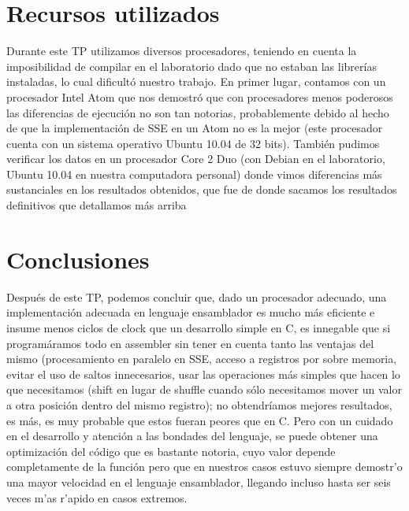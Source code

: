 \documentclass[a4paper,10pt]{article}
\begin{document}
\section{Recursos utilizados}

Durante este TP utilizamos diversos procesadores, teniendo en cuenta la imposibilidad de compilar en el laboratorio dado que no estaban las librerías instaladas, lo cual dificultó nuestro trabajo. En primer lugar, contamos con un procesador Intel Atom que nos demostró que con procesadores menos poderosos las diferencias de ejecución no son tan notorias, probablemente debido al hecho de que la implementación de SSE en un Atom no es la mejor (este procesador cuenta con un sistema operativo Ubuntu 10.04 de 32 bits). También pudimos verificar los datos en un procesador Core 2 Duo (con Debian en el laboratorio, Ubuntu 10.04 en nuestra computadora personal) donde vimos diferencias más sustanciales en los resultados obtenidos, que fue de donde sacamos los resultados definitivos que detallamos más arriba

\section{Conclusiones}

Después de este TP, podemos concluir que, dado un procesador adecuado, una implementación adecuada en lenguaje ensamblador es mucho más eficiente e insume menos ciclos de clock que un desarrollo simple en C, es innegable que si programáramos todo en assembler sin tener en cuenta tanto las ventajas del mismo (procesamiento en paralelo en SSE, acceso a registros por sobre memoria, evitar el uso de saltos innecesarios, usar las operaciones más simples que hacen lo que necesitamos (shift en lugar de shuffle cuando sólo necesitamos mover un valor a otra posición dentro del mismo registro); no obtendríamos mejores resultados, es más, es muy probable que estos fueran peores que en C. Pero con un cuidado en el desarrollo y atención a las bondades del lenguaje, se puede obtener una optimización del código que es bastante notoria, cuyo valor depende completamente de la función pero que en nuestros casos estuvo siempre demostr'o una mayor velocidad en el lenguaje ensamblador, llegando incluso hasta ser seis veces m'as r'apido en casos extremos.
\end{document}
